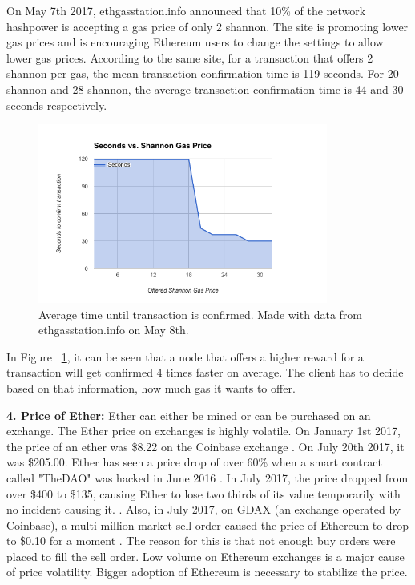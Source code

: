 On May 7th 2017, ethgasstation.info announced \cite{ETHGasStationAnnouncement} that 10\% of the network hashpower is accepting a gas price of only 2 shannon. The site is promoting lower gas prices and is encouraging Ethereum users to change the settings to allow lower gas prices. According to the same site, for a transaction that offers 2 shannon per gas, the mean transaction confirmation time is 119 seconds. For 20 shannon and 28 shannon, the average transaction confirmation time is 44 and 30 seconds respectively.

\begin{figure}[H]
\centering
\includegraphics[width=0.85\textwidth]{gas-vs-transaction-time.png}
\caption{Average time until transaction is confirmed. Made with data from ethgasstation.info on May 8th.}
\label{fig:gas}
\end{figure}

In Figure ~\ref{fig:gas}, it can be seen that a node that offers a higher reward for a transaction will get confirmed 4 times faster on average. The client has to decide based on that information, how much gas it wants to offer.

\textbf{4. Price of Ether:} Ether can either be mined or can be purchased on an exchange. The Ether price on exchanges is highly volatile. On January 1st 2017, the price of an ether was \$8.22 on the Coinbase exchange \cite{Coinbase}. On July 20th 2017, it was \$205.00. Ether has seen a price drop of over 60\% when a smart contract called "TheDAO" was hacked in June 2016 \cite{DAO}. In July 2017, the price dropped from over \$400 to \$135, causing Ether to lose two thirds of its value temporarily with no incident causing it. \cite{Coinbase}. Also, in July 2017, on GDAX (an exchange operated by Coinbase), a multi-million market sell order caused the price of Ethereum to drop to \$0.10 for a moment \cite{EthereumCent}. The reason for this is that not enough buy orders were placed to fill the sell order. Low volume on Ethereum exchanges is a major cause of price volatility. Bigger adoption of Ethereum is necessary to stabilize the price.

